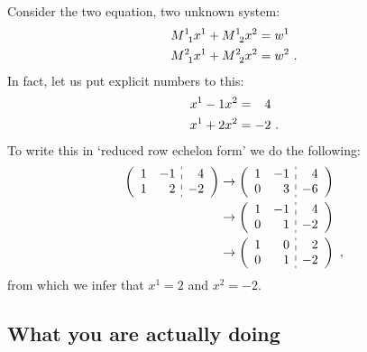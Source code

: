 \documentclass[12pt, oneside]{report}    %
\begin{document}
\begin{example}\label{eg:rref:2d}
Consider the two equation, two unknown system:
\begin{align}
    M\aij{1}{1} x^1 + M\aij{1}{2}x^2 &= w^1\\
    M\aij{2}{1} x^1 + M\aij{2}{2}x^2 &= w^2 \ .
\end{align}
In fact, let us put explicit numbers to this:
\begin{align}
    x^1 - 1 x^2 &=  \pp 4 \\
    x^1 + 2x^2 &= -2 \ .
\end{align}
To write this in `reduced row echelon form' we do the following:
\begin{align}
    \left(\begin{array}{cc:c}
        1 & -1 & \pp 4 \\
        1 & \pp 2 & -2
    \end{array}\right)
    &\to 
    \left(\begin{array}{cc:c}
        1 & -1 & \pp 4 \\
        0 & \pp 3 & -6
    \end{array}\right)
    \\
    &\to 
    \left(\begin{array}{cc:c}
        1 & -1 & \pp 4 \\
        0 & \pp 1 & -2
    \end{array}\right)
    \\
    &\to 
    \left(\begin{array}{cc:c}
        1 & \pp 0 & \pp 2 \\
        0 & \pp 1 & -2
    \end{array}\right)
    \ ,
\end{align}
from which we infer that $x^1 = 2$ and $x^2 = -2$. 
\end{example}

\subsection{What you are actually doing}
\end{document}
